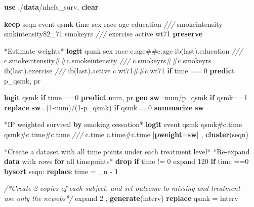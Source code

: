 \documentclass[
  10pt,
]{book}
\newenvironment{Shaded}{\begin{snugshade}}{\end{snugshade}}
\newcommand{\BaseNTok}[1]{\textcolor[rgb]{0.00,0.00,0.81}{#1}}
\newcommand{\CommentTok}[1]{\textcolor[rgb]{0.56,0.35,0.01}{\textit{#1}}}
\newcommand{\DataTypeTok}[1]{\textcolor[rgb]{0.13,0.29,0.53}{#1}}
\newcommand{\DecValTok}[1]{\textcolor[rgb]{0.00,0.00,0.81}{#1}}
\newcommand{\FunctionTok}[1]{\textcolor[rgb]{0.00,0.00,0.00}{#1}}
\newcommand{\KeywordTok}[1]{\textcolor[rgb]{0.13,0.29,0.53}{\textbf{#1}}}
\newcommand{\NormalTok}[1]{#1}
\newcommand{\OtherTok}[1]{\textcolor[rgb]{0.56,0.35,0.01}{#1}}
\begin{document}
\begin{Shaded}
\begin{Highlighting}[]
\KeywordTok{use}\NormalTok{ ./}\KeywordTok{data}\NormalTok{/nhefs\_surv, }\KeywordTok{clear}

\KeywordTok{keep}\NormalTok{ seqn event qsmk time sex race age education }\CommentTok{///}
\NormalTok{  smokeintensity smkintensity82\_71 smokeyrs }\CommentTok{///}
\NormalTok{  exercise active wt71}
\KeywordTok{preserve} 

\NormalTok{*Estimate weights*}
\KeywordTok{logit}\NormalTok{ qsmk sex race c.age\#\#c.age ib(}\FunctionTok{last}\NormalTok{).education }\CommentTok{///}
\NormalTok{  c.smokeintensity\#\#c.smokeintensity }\CommentTok{///}
\NormalTok{  c.smokeyrs\#\#c.smokeyrs ib(}\FunctionTok{last}\NormalTok{).exercise }\CommentTok{///}
\NormalTok{  ib(}\FunctionTok{last}\NormalTok{).active c.wt71\#\#c.wt71 }\KeywordTok{if}\NormalTok{ time == 0}
\KeywordTok{predict}\NormalTok{ p\_qsmk, pr}

\KeywordTok{logit}\NormalTok{ qsmk }\KeywordTok{if}\NormalTok{ time ==0 }
\KeywordTok{predict}\NormalTok{ num, pr}
\KeywordTok{gen} \KeywordTok{sw}\NormalTok{=num/p\_qsmk }\KeywordTok{if}\NormalTok{ qsmk==1}
\KeywordTok{replace} \KeywordTok{sw}\NormalTok{=(1{-}num)/(1{-}p\_qsmk) }\KeywordTok{if}\NormalTok{ qsmk==0}
\KeywordTok{summarize} \KeywordTok{sw}

\NormalTok{*IP weighted survival }\KeywordTok{by}\NormalTok{ smoking cessation*}
\KeywordTok{logit}\NormalTok{ event qsmk qsmk\#c.time qsmk\#c.time\#c.time }\CommentTok{///}
\NormalTok{  c.time c.time\#c.time [}\KeywordTok{pweight}\NormalTok{=}\KeywordTok{sw}\NormalTok{] , }\KeywordTok{cluster}\NormalTok{(seqn) }

\NormalTok{*Create a dataset with }\OtherTok{all}\NormalTok{ time points under each treatment }\DecValTok{level}\NormalTok{*}
\NormalTok{*Re{-}expand }\KeywordTok{data}\NormalTok{ with }\BaseNTok{rows} \KeywordTok{for} \OtherTok{all}\NormalTok{ timepoints*}
\KeywordTok{drop} \KeywordTok{if}\NormalTok{ time != 0}
\NormalTok{expand 120 }\KeywordTok{if}\NormalTok{ time ==0 }
\KeywordTok{bysort}\NormalTok{ seqn: }\KeywordTok{replace}\NormalTok{ time = }\DataTypeTok{\_n}\NormalTok{ {-} 1       }
        
\CommentTok{/*Create 2 copies of each subject, and set outcome }
\CommentTok{to missing and treatment {-}{-} use only the newobs*/}
\NormalTok{expand 2 , }\KeywordTok{generate}\NormalTok{(interv) }
\KeywordTok{replace}\NormalTok{ qsmk = interv   }


\end{Highlighting}
\end{Shaded}
\end{document}
